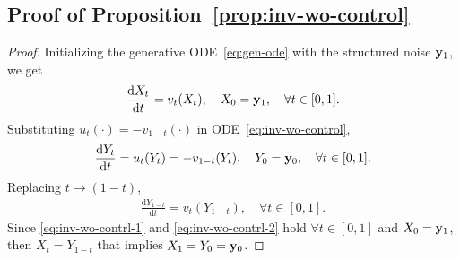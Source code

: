 \documentclass{article} %
\theoremstyle{plain}
\newcommand{\deriv}{\mathrm{d}}
\begin{document}
\subsection{Proof of Proposition~\ref{prop:inv-wo-control}}
\label{sec:proofs-prop-inv-wo-control}
\begin{proof}
Initializing the generative ODE~\eqref{eq:gen-ode} with the structured noise ${\mathbf{y}}_1$, we get
\begin{align}
\label{eq:inv-wo-contrl-1}
    \frac{\deriv X_t}{\deriv t} = v_t(X_t), \quad X_0 =\rvy_1, \quad \forall t\in[0,1].
\end{align}
Substituting $u_t(\cdot) = -v_{1-t}(\cdot)$ in ODE~\eqref{eq:inv-wo-control}, 
\begin{align*}
    \frac{\deriv Y_t}{\deriv t} 
    = u_t(Y_t)
    = -v_{1-t}(Y_t),\quad Y_0 = \rvy_0, \quad \forall t\in[0,1].
\end{align*}
Replacing $t\rightarrow (1-t)$,
\begin{align}
\label{eq:inv-wo-contrl-2}
    \frac{\deriv Y_{1-t}}{\deriv t} 
    = v_{t}(Y_{1-t}), \quad \forall t\in[0,1].
\end{align}
Since \eqref{eq:inv-wo-contrl-1} and \eqref{eq:inv-wo-contrl-2} hold $\forall t\in[0,1]$ and $X_0 = {\mathbf{y}}_1$, then $X_t = Y_{1-t}$ that implies $X_1 = Y_0 = {\mathbf{y}}_0$.
\end{proof}
\end{document}
